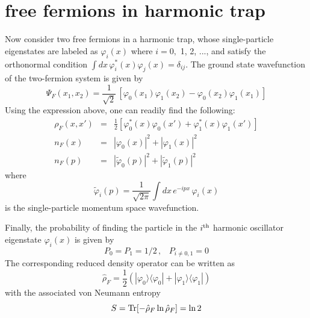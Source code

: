 \documentclass[onecolumn,english,aps,pra]{revtex4}
\begin{document}
\section{free fermions in harmonic trap}
Now consider two free fermions in a harmonic trap, whose single-particle eigenstates are labeled as $\varphi_i(x)$ where $i =0,$ 1, 2, ..., and satisfy the orthonormal condition $ \int dx \, \varphi_i^*(x) \varphi_j(x) = \delta_{ij}$. The ground state wavefunction of the two-fermion system is given by \[ \Psi_F(x_1,x_2) = \frac{1}{\sqrt{2}} \,\left[ \varphi_0(x_1) \varphi_1(x_2) -\varphi_0(x_2) \varphi_1(x_1) \right]  \]
Using the expression above, one can readily find the following:
\begin{eqnarray}
\rho_F(x,x') &=& \frac{1}{2} \left[ \varphi_0^*(x) \varphi_0(x') +  \varphi_1^*(x) \varphi_1(x') \right] \\
n_F(x) &=& |\varphi_0(x)|^2 + |\varphi_1(x)|^2 \\
n_F(p) &=& |\tilde{\varphi}_0(p)|^2 + |\tilde{\varphi}_1(p)|^2 
\end{eqnarray}
where \[ \tilde{\varphi}_i(p) = \frac{1}{\sqrt{2\pi}} \int dx \, e^{-ipx}\,\varphi_i(x) \] is the single-particle momentum space wavefunction.

Finally, the probability of finding the particle in the $i^{\rm th}$ harmonic oscillator eigenstate $\varphi_i(x)$ is given by \[ P_0=P_1=1/2\,,\;\;\;P_{i\neq 0,1}=0 \]
The corresponding reduced density operator can be written as 
\[ \hat{\rho}_F = \frac{1}{2} \left( |\varphi_0 \rangle \langle \varphi_0| + |\varphi_1 \rangle \langle \varphi_1| \right) \] with the associated von Neumann entropy \[ S = {\rm Tr}[-\hat{\rho}_F \ln \hat{\rho}_F ] =\ln 2 \]
\end{document}
